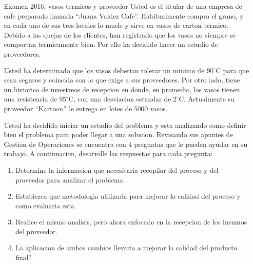 \begin{enunciado}{Examen 2016, vasos termicos y proveedor}
Usted es el titular de una empresa de cafe preparado llamada ``Juana Valdez Cafe''. Habitualmente compra el grano, y en cada uno de sus tres locales lo muele y sirve en vasos de carton termico. Debido a las quejas de los clientes, han registrado que los vasos no siempre se comportan termicamente bien. Por ello ha decidido hacer un estudio de proveedores.

Usted ha determinado que los vasos deberian tolerar un minimo de $90^\circ\text{C}$ para que sean seguros y coincida con lo que exige a sus proveedores. Por otro lado, tiene un historico de muestreos de recepcion en donde, en promedio, los vasos tienen una resistencia de $95^\circ\text{C}$, con una desviacion estandar de $2^\circ\text{C}$. Actualmente su proveedor ``Kartoon'' le entrega en lotes de 5000 vasos.

Usted ha decidido iniciar un estudio del problema y esta analizando como definir bien el problema para poder llegar a una solucion. Revisando sus apuntes de Gestion de Operaciones se encuentra con 4 preguntas que le pueden ayudar en su trabajo. A continuacion, desarrolle las respuestas para cada pregunta:

\begin{enumerate}[label=\alph*)]
  \item Determine la informacion que necesitaria recopilar del proceso y del proveedor para analizar el problema.
  \item Establezca que metodologia utilizaria para mejorar la calidad del proceso y como evaluaria esta.
  \item Realice el mismo analisis, pero ahora enfocado en la recepcion de los insumos del proveedor.
  \item La aplicacion de ambos cambios llevaria a mejorar la calidad del producto final?
\end{enumerate}
\end{enunciado}

